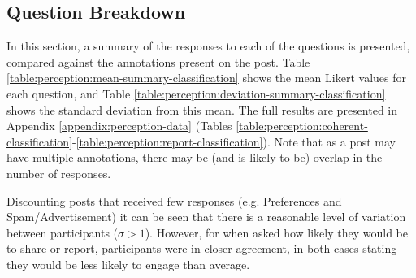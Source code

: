 \subsection{Question Breakdown}
\label{perception:results:breakdown}
In this section, a summary of the responses to each of the questions is presented, compared against the annotations present on the post. Table \ref{table:perception:mean-summary-classification} shows the mean Likert values for each question, and Table \ref{table:perception:deviation-summary-classification} shows the standard deviation from this mean. The full results are presented in Appendix \ref{appendix:perception-data} (Tables \ref{table:perception:coherent-classification}-\ref{table:perception:report-classification}). Note that as a post may have multiple annotations, there may be (and is likely to be) overlap in the number of responses.  

Discounting posts that received few responses (e.g. Preferences and Spam/Advertisement) it can be seen that there is a reasonable level of variation between participants ($\sigma>1$). However, for when asked how likely they would be to share
or report,
participants were in closer agreement, in both cases stating they would be less likely to engage than average.


